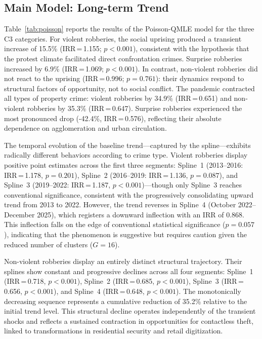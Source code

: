 \documentclass[pdflatex,sn-basic]{sn-jnl}
\begin{document}
\subsection{Main Model: Long-term Trend}
\label{sub:inferencial}

Table~\ref{tab:poisson} reports the results of the Poisson-QMLE model for the three C3 categories. For violent robberies, the social uprising produced a transient increase of 15.5\% (IRR\,=\,1.155; $p<0.001$), consistent with the hypothesis that the protest climate facilitated direct confrontation crimes. Surprise robberies increased by 6.9\% (IRR\,=\,1.069; $p<0.001$). In contrast, non-violent robberies did not react to the uprising (IRR\,=\,0.996; $p=0.761$): their dynamics respond to structural factors of opportunity, not to social conflict. The pandemic contracted all types of property crime: violent robberies by 34.9\% (IRR\,=\,0.651) and non-violent robberies by 35.3\% (IRR\,=\,0.647). Surprise robberies experienced the most pronounced drop (-42.4\%, IRR\,=\,0.576), reflecting their absolute dependence on agglomeration and urban circulation.

The temporal evolution of the baseline trend---captured by the spline---exhibits radically different behaviors according to crime type. Violent robberies display positive point estimates across the first three segments: Spline~1 (2013--2016: IRR\,=\,1.178, $p=0.201$), Spline~2 (2016--2019: IRR\,=\,1.136, $p=0.087$), and Spline~3 (2019--2022: IRR\,=\,1.187, $p<0.001$)---though only Spline~3 reaches conventional significance, consistent with the progressively consolidating upward trend from 2013 to 2022. However, the trend reverses in Spline~4 (October 2022--December 2025), which registers a downward inflection with an IRR of 0.868. This inflection falls on the edge of conventional statistical significance ($p=0.057$), indicating that the phenomenon is suggestive but requires caution given the reduced number of clusters ($G=16$). 

Non-violent robberies display an entirely distinct structural trajectory. Their splines show constant and progressive declines across all four segments: Spline~1 (IRR\,=\,0.718, $p<0.001$), Spline~2 (IRR\,=\,0.685, $p<0.001$), Spline~3 (IRR\,=\,0.656, $p<0.001$), and Spline~4 (IRR\,=\,0.648, $p<0.001$). The monotonically decreasing sequence represents a cumulative reduction of 35.2\% relative to the initial trend level. This structural decline operates independently of the transient shocks and reflects a sustained contraction in opportunities for contactless theft, linked to transformations in residential security and retail digitization.
\end{document}

